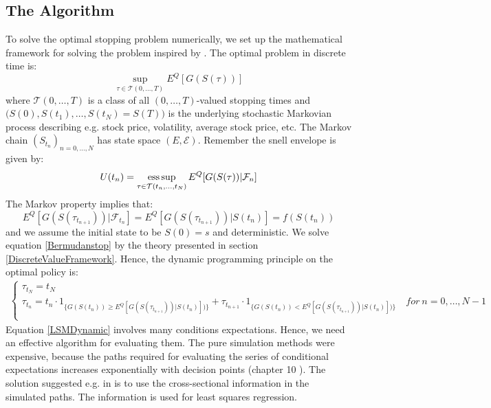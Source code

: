 \subsection{The Algorithm}
To solve the optimal stopping problem numerically, we set up the mathematical framework for solving the problem inspired by \parencite{analysisLSM}. The optimal problem in discrete time is:
\begin{equation}\label{Bermudanstop}
\sup_{\tau \in \mathcal{T}(0,\ldots,T)} E^Q[G(S(\tau))]
\end{equation}
where $\mathcal{T}(0,\ldots,T)$ is a class of all $(0,\ldots,T)$-valued stopping times and $\bigg(S(0),S(t_1), \ldots, S(t_N)=S(T)\bigg)$ is the underlying stochastic Markovian process describing e.g. stock price, volatility, average stock price, etc. The Markov chain $(S_{t_n})_{n=0,\ldots,N}$ has state space $(E, \mathcal{E})$. Remember the snell envelope is given by:
$$U(t_n)=\operatorname*{ess\,sup}_{\tau \in \mathcal{T}(t_n,\ldots,t_N)} E^Q[G(S(\tau))|\mathcal{F}_n]$$
The Markov property implies that:
$$E^Q[G(S(\tau_{t_{n+1}}))|\mathcal{F}_{t_n}]=E^Q[G(S(\tau_{t_{n+1}}))|S(t_n)]=f(S(t_n))$$ 
and we assume the initial state to be $S(0)=s$ and deterministic. We solve equation \eqref{Bermudanstop} by the theory presented in section \ref{DiscreteValueFramework}. Hence, the dynamic programming principle on the optimal policy is:
\begin{equation}\label{LSMDynamic}
\begin{split}
\begin{cases}
          \tau_{t_N} = t_N\\
          \tau_{t_n} = t_n \cdot 1_{\{G(S(t_n)) \geq E^Q[G(S(\tau_{t_{n+1}}))|S(t_n)])\}} + \tau_{t_{n+1}} \cdot 1_{\{G(S(t_n)) < E^Q[G(S(\tau_{t_{n+1}}))|S(t_n)])\}} \quad for \ n={0,\ldots,N-1} \\ 
\end{cases}
\end{split}
\end{equation}
Equation \eqref{LSMDynamic} involves many conditions expectations. Hence, we need an effective algorithm for evaluating them. The pure simulation methods were expensive, because the paths required for evaluating the series of conditional expectations increases exponentially with decision points (chapter 10 \parencite{OVERHAUSMARCUS2007EHD}). The solution suggested e.g. in \parencite{LSM,Tsitsiklis} is to use the cross-sectional information in the simulated paths. The information is used for least squares regression. \\

